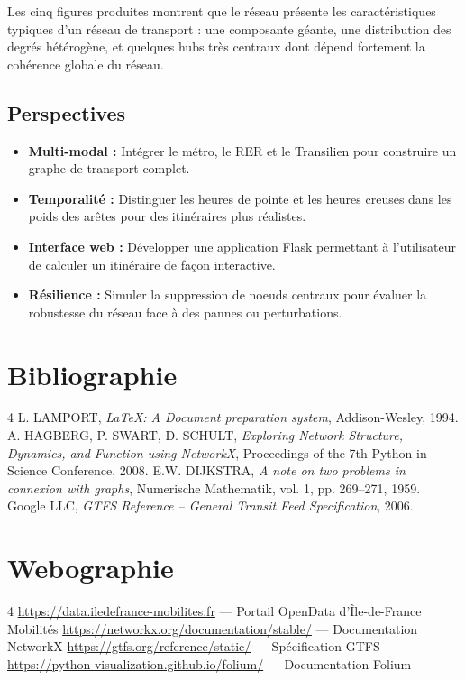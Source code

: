 \documentclass[a4paper, 12pt, twoside]{article}
\begin{document}
	Les cinq figures produites montrent que le réseau présente les caractéristiques typiques d'un réseau de transport : une composante géante, une distribution des degrés hétérogène, et quelques hubs très centraux dont dépend fortement la cohérence globale du réseau.

	\subsection{Perspectives}

	\begin{itemize}
	    \item \textbf{Multi-modal :} Intégrer le métro, le RER et le Transilien pour construire un graphe de transport complet.
	    \item \textbf{Temporalité :} Distinguer les heures de pointe et les heures creuses dans les poids des arêtes pour des itinéraires plus réalistes.
	    \item \textbf{Interface web :} Développer une application Flask permettant à l'utilisateur de calculer un itinéraire de façon interactive.
	    \item \textbf{Résilience :} Simuler la suppression de noeuds centraux pour évaluer la robustesse du réseau face à des pannes ou perturbations.
	\end{itemize}

\newpage
\section{Bibliographie}
\renewcommand{\bibname}{}
\renewcommand{\refname}{}
\begin{thebibliography}{4}
    L. LAMPORT, {\it \LaTeX : A Document preparation system}, Addison-Wesley, 1994.
    A. HAGBERG, P. SWART, D. SCHULT, {\it Exploring Network Structure, Dynamics, and Function using NetworkX}, Proceedings of the 7th Python in Science Conference, 2008.
    E.W. DIJKSTRA, {\it A note on two problems in connexion with graphs}, Numerische Mathematik, vol. 1, pp. 269--271, 1959.
    Google LLC, {\it GTFS Reference -- General Transit Feed Specification}, 2006.
\end{thebibliography}

\newpage
\section{Webographie}
\begin{thebibliography}{4}
    \url{https://data.iledefrance-mobilites.fr} --- Portail OpenData d'Île-de-France Mobilités
    \url{https://networkx.org/documentation/stable/} --- Documentation NetworkX
    \url{https://gtfs.org/reference/static/} --- Spécification GTFS
    \url{https://python-visualization.github.io/folium/} --- Documentation Folium
\end{thebibliography}
\end{document}
